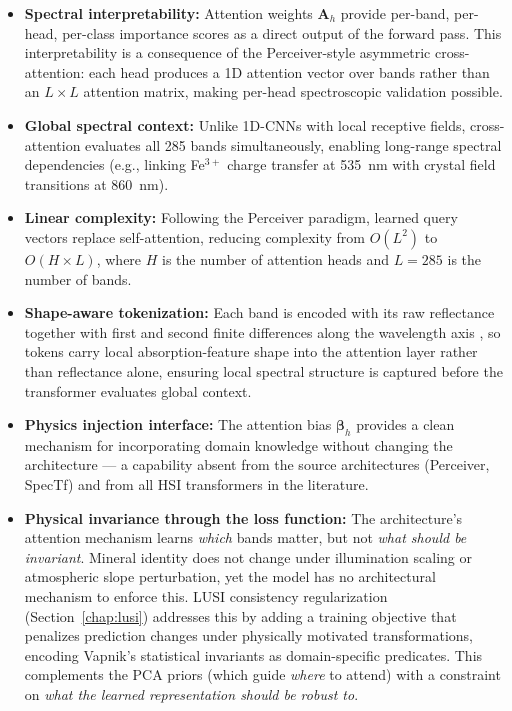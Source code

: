 \documentclass[11pt]{report}
\begin{document}
\begin{itemize}
  \item \textbf{Spectral interpretability:} Attention weights $\mathbf{A}_h$ provide per-band, per-head, per-class importance scores as a direct output of the forward pass. This interpretability is a consequence of the Perceiver-style asymmetric cross-attention: each head produces a 1D attention vector over bands rather than an $L \times L$ attention matrix, making per-head spectroscopic validation possible.
  \item \textbf{Global spectral context:} Unlike 1D-CNNs with local receptive fields, cross-attention evaluates all 285 bands simultaneously, enabling long-range spectral dependencies (e.g., linking Fe$^{3+}$ charge transfer at 535~nm with crystal field transitions at 860~nm).
  \item \textbf{Linear complexity:} Following the Perceiver paradigm, learned query vectors replace self-attention, reducing complexity from $O(L^2)$ to $O(H \times L)$, where $H$ is the number of attention heads and $L = 285$ is the number of bands.
  \item \textbf{Shape-aware tokenization:} Each band is encoded with its raw reflectance together with first and second finite differences along the wavelength axis \cite{tsai1998derivative}, so tokens carry local absorption-feature shape into the attention layer rather than reflectance alone, ensuring local spectral structure is captured before the transformer evaluates global context.
  \item \textbf{Physics injection interface:} The attention bias $\bm{\beta}_h$ provides a clean mechanism for incorporating domain knowledge without changing the architecture --- a capability absent from the source architectures (Perceiver, SpecTf) and from all HSI transformers in the literature.
  \item \textbf{Physical invariance through the loss function:} The architecture's attention mechanism learns \emph{which} bands matter, but not \emph{what should be invariant}. Mineral identity does not change under illumination scaling or atmospheric slope perturbation, yet the model has no architectural mechanism to enforce this. LUSI consistency regularization (Section~\ref{chap:lusi}) addresses this by adding a training objective that penalizes prediction changes under physically motivated transformations, encoding Vapnik's statistical invariants as domain-specific predicates. This complements the PCA priors (which guide \emph{where} to attend) with a constraint on \emph{what the learned representation should be robust to}.
\end{itemize}
\end{document}
